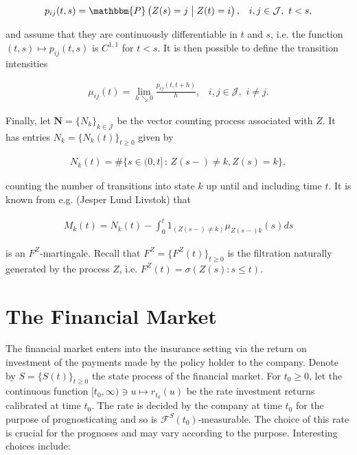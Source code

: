 \documentclass{book}
\newcommand{\1}[1]{\mathbbm{1}_{\left\lbrace #1 \right\rbrace}}
\theoremstyle{break}
\theoremstyle{remark}
\numberwithin{equation}{section}
\begin{document}
\begin{align*}
    p_{ij}(t,s) =  \mathbbm{P} \left( Z(s)=j \;\middle\vert\; Z(t)=i \right), \, \, \, \, \, i,j \in \mathcal{J}, \, \, t < s,
\end{align*}

and assume that they are continuously differentiable in $t$ and $s$, i.e. the function $(t,s) \mapsto p_{ij}(t,s)$ is $C^{1,1}$ for $t < s$. It is then possible to define the transition intensities

\begin{align*}
    \mu_{ij}(t) = \lim_{h \searrow 0} \frac{p_{ij} \left( t,t+h \right)}{h}, \, \, \, \, \, i,j \in \mathcal{J}, \, \, i \neq j.
\end{align*}

Finally, let $\textbf{N} = \{ N_{k} \}_{k \in \mathcal{J}}$ be the vector counting process associated with $Z$. It has entries $N_{k} = \{ N_{k}(t) \}_{t \geq 0}$ given by

\begin{align*}
    N_{k}(t) = \# \{ s \in (0,t] \, : \, Z(s-) \neq k, Z(s)=k \},
\end{align*}

counting the number of transitions into state $k$ up until and including time $t$. It is known from e.g. (Jesper Lund Livstok) that

\begin{align*}
    M_{k}(t) = N_{k}(t) - \int_0^t 1_{( Z(s-) \neq k)} \mu_{Z(s-)k}(s)ds
\end{align*}

is an $F^Z$-martingale. Recall that $F^Z= \{ F^Z(t) \}_{t \geq 0}$ is the filtration naturally generated by the process $Z$, i.e. $F^Z(t) = \sigma(Z(s) : s \leq t)$.

\section{The Financial Market}

The financial market enters into the insurance setting via the return on investment of the payments made by the policy holder to the company. Denote by $S = \{ S(t) \}_{t \geq 0}$ the state process of the financial market. For $t_0 \geq 0$, let the continuous function $[t_0,\infty) \ni u \mapsto r_{t_0}(u)$ be the rate investment returns calibrated at time $t_0$. The rate is decided by the company at time $t_0$ for the purpose of prognosticating and so is $\mathcal{F}^{S}(t_0)$-measurable. The choice of this rate is crucial for the prognoses and may vary according to the purpose. Interesting choices include:
\end{document}
